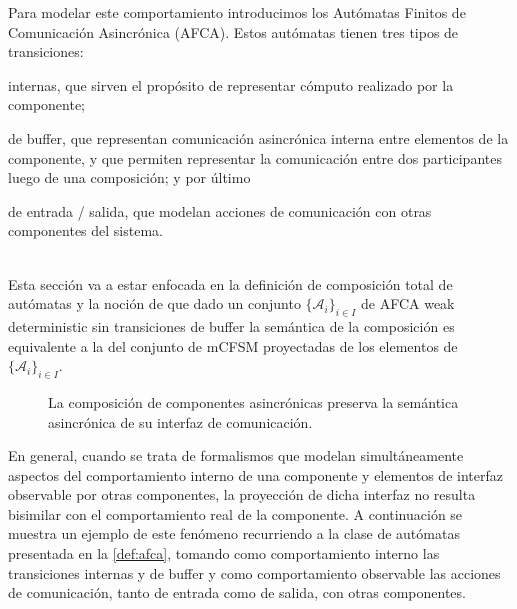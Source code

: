 Para modelar este comportamiento introducimos los Autómatas Finitos de Comunicación Asincrónica (AFCA). Estos autómatas tienen tres tipos de transiciones: 
\begin{inparaenum}[1)]
\item internas, que sirven el propósito de representar cómputo realizado por la componente; 
\item de buffer, que representan comunicación asincrónica interna entre elementos de la componente, y que permiten representar la comunicación entre dos participantes luego de una composición; y por último 
\item de entrada / salida, que modelan acciones de comunicación con otras componentes del sistema.
\end{inparaenum} \\
Esta sección va a estar enfocada en la definición de composición total de autómatas y la noción de que dado un conjunto $\{ \mathcal{A}_i\}_{i \in I}$ de AFCA weak deterministic sin transiciones de buffer la semántica de la composición es equivalente a la del conjunto de mCFSM proyectadas de los elementos de $\{ \mathcal{A}_i\}_{i \in I}$. 

\begin{figure}[ht]
\caption{La composición de componentes asincrónicas preserva la semántica asincrónica de su interfaz de comunicación.}
\label{fig:preservacion}
\end{figure}


En general, cuando se trata de formalismos que modelan simultáneamente aspectos del comportamiento interno de una componente y elementos de interfaz observable por otras componentes, la proyección de dicha interfaz no resulta bisimilar con el comportamiento real de la componente. A continuación se muestra un ejemplo de este fenómeno recurriendo a la clase de autómatas presentada en la \ref{def:afca}, tomando como comportamiento interno las transiciones internas y de buffer y como comportamiento observable las acciones de comunicación, tanto de entrada como de salida, con otras componentes.

